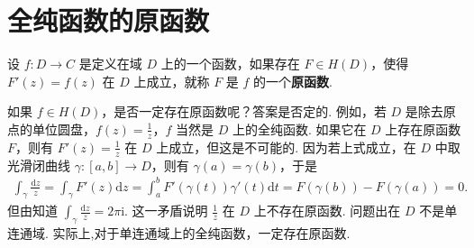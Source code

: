 \documentclass[../../main.tex]{subfiles}
\begin{document}
\section{全纯函数的原函数}

\begin{definition}
设 \( f:D \to C \) 是定义在域 \( D \) 上的一个函数，如果存在 \( F \in H(D) \)，使得 \( F'(z) = f(z) \) 在 \( D \) 上成立，就称 \( F \) 是 \( f \) 的一个\textbf{原函数}.
\end{definition}

如果 \( f \in H(D) \)，是否一定存在原函数呢？答案是否定的. 例如，若 \( D \) 是除去原点的单位圆盘，\( f(z) = \frac{1}{z} \)，\( f \) 当然是 \( D \) 上的全纯函数. 如果它在 \( D \) 上存在原函数 \( F \)，则有 \( F'(z) = \frac{1}{z} \) 在 \( D \) 上成立，但这是不可能的. 因为若上式成立，在 \( D \) 中取光滑闭曲线 \( \gamma: [a,b] \to D \)，则有 \( \gamma(a) = \gamma(b) \)，于是
\begin{align*}
\int_{\gamma} \frac{\mathrm{d}z }{z} = \int_{\gamma} F'(z) \mathrm{d}z  = \int_{a}^{b} F'(\gamma(t)) \gamma'(t) \mathrm{d}t = F(\gamma(b)) - F(\gamma(a)) = 0.
\end{align*}
但由知道 \( \int_{\gamma} \frac{\mathrm{d}z }{z} = 2\pi \mathrm{i} \). 这一矛盾说明 \( \frac{1}{z} \) 在 \( D \) 上不存在原函数. 问题出在 \( D \) 不是单连通域. 实际上,对于单连通域上的全纯函数，一定存在原函数.
\end{document}

